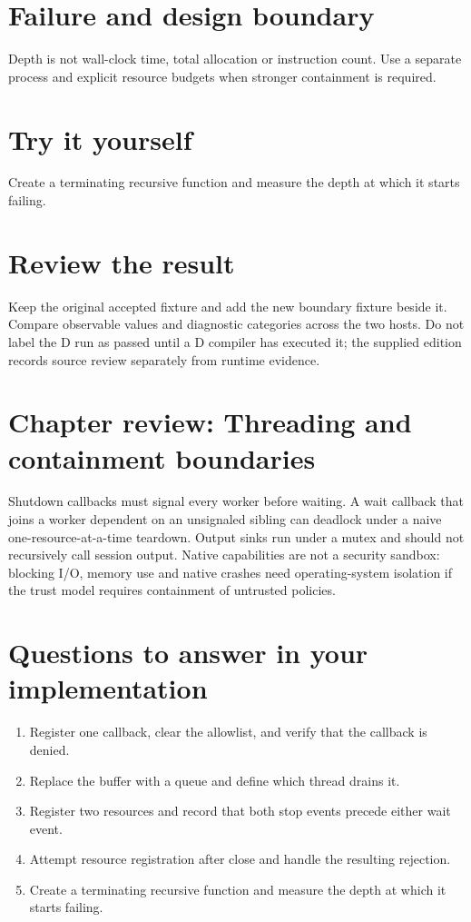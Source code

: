 
\section*{Failure and design boundary}
Depth is not wall-clock time, total allocation or instruction count. Use a separate process and explicit resource budgets when stronger containment is required.

\section*{Try it yourself}
Create a terminating recursive function and measure the depth at which it starts failing.

\section*{Review the result}
Keep the original accepted fixture and add the new boundary fixture beside it. Compare observable values and diagnostic categories across the two hosts. Do not label the D run as passed until a D compiler has executed it; the supplied edition records source review separately from runtime evidence.

\clearpage
\section*{Chapter review: Threading and containment boundaries}
Shutdown callbacks must signal every worker before waiting. A wait callback that joins a worker dependent on an unsignaled sibling can deadlock under a naive one-resource-at-a-time teardown. Output sinks run under a mutex and should not recursively call session output. Native capabilities are not a security sandbox: blocking I/O, memory use and native crashes need operating-system isolation if the trust model requires containment of untrusted policies.

\section*{Questions to answer in your implementation}
\begin{enumerate}
\item Register one callback, clear the allowlist, and verify that the callback is denied.
\item Replace the buffer with a queue and define which thread drains it.
\item Register two resources and record that both stop events precede either wait event.
\item Attempt resource registration after close and handle the resulting rejection.
\item Create a terminating recursive function and measure the depth at which it starts failing.
\end{enumerate}
